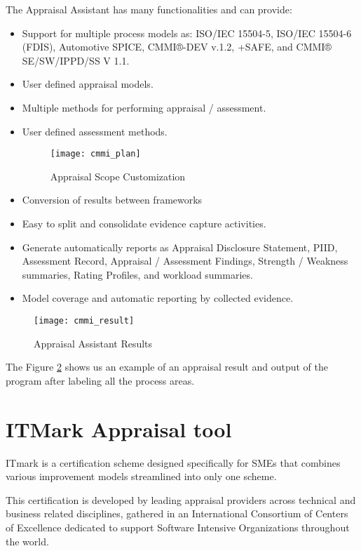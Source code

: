 The Appraisal Assistant has many functionalities and can provide:
\begin{itemize}
	\item Support for multiple process models as: ISO/IEC 15504-5, ISO/IEC 15504-6 (FDIS), Automotive SPICE, CMMI®-DEV v.1.2, +SAFE, and CMMI® SE/SW/IPPD/SS V 1.1.
	\item User defined appraisal models.
	\item Multiple methods for performing appraisal / assessment.
	\item User defined assessment methods.
	\begin{figure}[h]
		\begin{center}
			\leavevmode
			\texttt{[image: cmmi\_plan]}
			\caption{Appraisal Scope Customization}
			\label{fig:cmmi_plan}
		\end{center}
	\end{figure}
	\item Conversion of results between frameworks
	\item Easy to split and consolidate evidence capture activities.
	\item Generate automatically reports as Appraisal Disclosure Statement, PIID, Assessment Record, Appraisal / Assessment Findings, Strength / Weakness summaries, Rating Profiles, and workload summaries.
	\item Model coverage and automatic reporting by collected evidence.
\end{itemize}


\begin{figure}[h]
	\begin{center}
		\leavevmode
		\texttt{[image: cmmi\_result]}
		\caption{Appraisal Assistant Results}
		\label{fig:cmmi_result}
	\end{center}
\end{figure}

The Figure \ref{fig:cmmi_result} shows us an example of an appraisal result and output of the program after labeling all the process areas.
\newpage


\section{ITMark Appraisal tool}

ITmark\citep{ITMARK} is a certification scheme designed specifically for SMEs that combines various improvement models streamlined into only one scheme.

This certification is developed by leading appraisal providers across technical and business related disciplines, gathered in an International Consortium of Centers of Excellence dedicated to support Software Intensive Organizations throughout the world.

